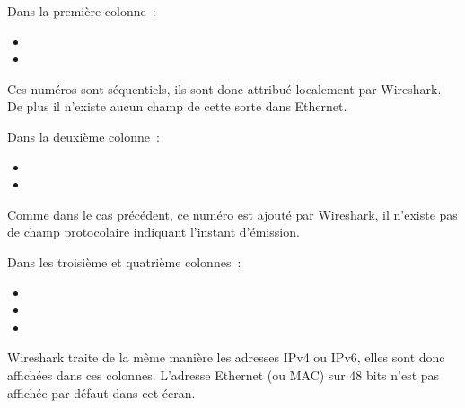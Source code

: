 {Dans la première colonne~:
 \begin{itemize}[label=$\circ$]
   \item {}
   \item {}
  \end{itemize}
}
{
Ces numéros sont séquentiels, ils sont donc attribué localement par Wireshark. De plus il n'existe aucun champ de cette sorte dans Ethernet.
}
{Dans la deuxième colonne~:
 \begin{itemize}[label=$\circ$]
   \item {}
   \item {}
  \end{itemize}
}
{
Comme dans le cas précédent, ce numéro est ajouté par Wireshark, il n'existe pas de champ protocolaire indiquant l'instant d'émission.
}
{Dans les troisième et quatrième colonnes~:
 \begin{itemize}[label=$\circ$]
   \item {}
   \item {}
   \item {}
  \end{itemize}
}
{
Wireshark traite de la même manière les adresses IPv4 ou IPv6, elles sont donc affichées dans ces colonnes. L'adresse Ethernet (ou MAC) sur 48 bits n'est pas affichée par défaut dans cet écran.
}

